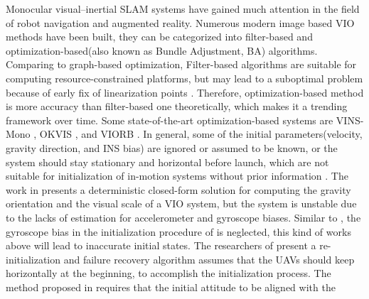 \documentclass[journal,article,submit,moreauthors,pdftex]{Definitions/mdpi}
\begin{document}
Monocular visual–inertial SLAM systems have gained much attention in the field of robot navigation and augmented reality\cite{xufumuAccurateInitialState2018}. Numerous modern image based VIO methods have been built, they can be categorized into filter-based \cite{tanskanenSemidirectEKFbasedMonocular2015,Bloesch2017Iterated,liHighprecisionConsistentEKFbased2013} and optimization-based(also known as Bundle Adjustment, BA) algorithms\cite{qinVINSMonoRobustVersatile2017,leuteneggerKeyframeBasedVisualInertialSLAM2013,mur-artalVisualInertialMonocularSLAM2017a}. Comparing to graph-based optimization, Filter-based algorithms are suitable for computing
resource-constrained platforms\cite{huangOnlineInitializationExtrinsic2020}, but may lead to a suboptimal problem because of early fix of linearization
points \cite{yangMonocularVisualInertial2017}. Therefore, optimization-based method is more accuracy than filter-based one theoretically, which makes it a trending framework over time. Some state-of-the-art optimization-based systems are VINS-Mono \cite{qinVINSMonoRobustVersatile2017}, OKVIS \cite{leuteneggerKeyframeBasedVisualInertialSLAM2013}, and VIORB \cite{mur-artalVisualInertialMonocularSLAM2017a}. In general, some of the initial parameters(velocity, gravity direction, and INS bias) are ignored or assumed to be known, or the system should stay stationary and horizontal before launch, which are not suitable for initialization of in-motion systems without prior information \cite{qinRobustInitializationMonocular2017}. The work in \cite{kneipDeterministicInitializationMetric2011} presents a deterministic closed-form solution for computing the gravity orientation and the visual scale of a VIO system, but the system is unstable due to the lacks of estimation for accelerometer and gyroscope biases. Similar to \cite{kneipDeterministicInitializationMetric2011}, the gyroscope bias in the initialization procedure of \cite{yangMonocularVisualInertial2017,martinelliClosedFormSolutionVisualInertial2014} is neglected, this kind of works above will lead to inaccurate initial states. The researchers of \cite{faesslerAutomaticReinitializationFailure2015} present a re-initialization and failure recovery algorithm assumes that the UAVs should keep horizontally at the beginning, to accomplish the initialization process. The method proposed in \cite{weissInertialOpticalFlow2015} requires that the initial attitude to be aligned with the
\end{document}
